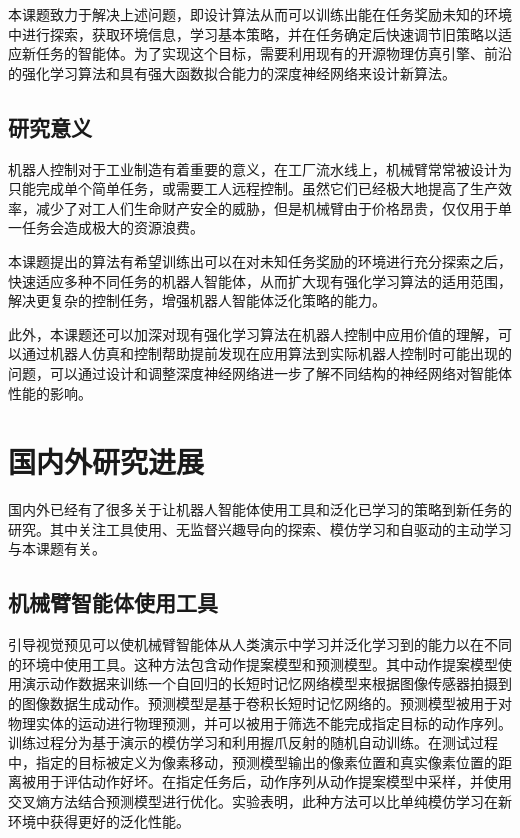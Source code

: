         本课题致力于解决上述问题，即设计算法从而可以训练出能在任务奖励未知的环境中进行探索，获取环境信息，学习基本策略，并在任务确定后快速调节旧策略以适应新任务的智能体。为了实现这个目标，需要利用现有的开源物理仿真引擎、前沿的强化学习算法和具有强大函数拟合能力的深度神经网络来设计新算法。
        
        \subsection{研究意义}

        机器人控制对于工业制造有着重要的意义，在工厂流水线上，机械臂常常被设计为只能完成单个简单任务，或需要工人远程控制。虽然它们已经极大地提高了生产效率，减少了对工人们生命财产安全的威胁，但是机械臂由于价格昂贵，仅仅用于单一任务会造成极大的资源浪费。

        本课题提出的算法有希望训练出可以在对未知任务奖励的环境进行充分探索之后，快速适应多种不同任务的机器人智能体，从而扩大现有强化学习算法的适用范围，解决更复杂的控制任务，增强机器人智能体泛化策略的能力。

        此外，本课题还可以加深对现有强化学习算法在机器人控制中应用价值的理解，可以通过机器人仿真和控制帮助提前发现在应用算法到实际机器人控制时可能出现的问题，可以通过设计和调整深度神经网络进一步了解不同结构的神经网络对智能体性能的影响。
    
    \section{国内外研究进展}

    国内外已经有了很多关于让机器人智能体使用工具和泛化已学习的策略到新任务的研究。其中关注工具使用、无监督兴趣导向的探索、模仿学习和自驱动的主动学习与本课题有关。
        \subsection{机械臂智能体使用工具}
        引导视觉预见\cite{xie2019improvisation}可以使机械臂智能体从人类演示中学习并泛化学习到的能力以在不同的环境中使用工具。这种方法包含动作提案模型和预测模型。其中动作提案模型使用演示动作数据来训练一个自回归的长短时记忆网络模型来根据图像传感器拍摄到的图像数据生成动作。预测模型是基于卷积长短时记忆网络的\cite{shi2015convolutional}。预测模型被用于对物理实体的运动进行物理预测，并可以被用于筛选不能完成指定目标的动作序列。训练过程分为基于演示的模仿学习和利用握爪反射的随机自动训练。在测试过程中，指定的目标被定义为像素移动，预测模型输出的像素位置和真实像素位置的距离被用于评估动作好坏。在指定任务后，动作序列从动作提案模型中采样，并使用交叉熵方法结合预测模型进行优化。实验表明，此种方法可以比单纯模仿学习在新环境中获得更好的泛化性能。

